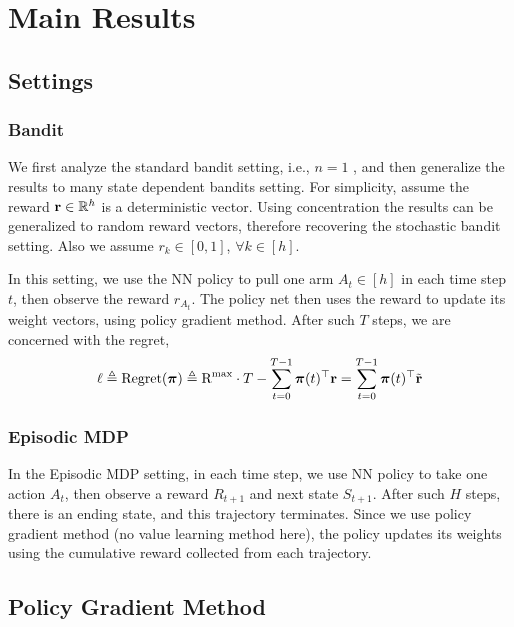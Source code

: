 \section{Main Results}

\subsection{Settings}

\subsubsection{Bandit}

We first analyze the standard bandit setting, i.e., $n = 1$ , and then generalize the results to many state dependent bandits setting. For simplicity, assume the reward ${\mathbf{r}} \in {\mathbb{R}}^h$ is a deterministic vector. Using concentration the results can be generalized to random reward vectors, therefore recovering the stochastic bandit setting. Also we assume $r_k \in [0, 1]$, $\forall k \in [h]$.

In this setting, we use the NN policy to pull one arm $A_t \in [h]$ in each time step $t$, then observe the reward $r_{A_t}$. The policy net then uses the reward to update its weight vectors, using policy gradient method. After such $T$ steps, we are concerned with the regret,
\begin{equation*}
    \ell \triangleq {\text{Regret}}({\boldsymbol{\pi}}) \triangleq {\text{R}}^{\max} \cdot T - \sum\limits_{t=0}^{T-1}{ {\boldsymbol{\pi}}(t)^\top {\mathbf{r}} } = \sum\limits_{t=0}^{T-1}{ {\boldsymbol{\pi}}(t)^\top {\tilde{\mathbf{r}}} }
\end{equation*}

\subsubsection{Episodic MDP}

In the Episodic MDP setting, in each time step, we use NN policy to take one action $A_t$, then observe a reward $R_{t+1}$ and next state $S_{t+1}$. After such $H$ steps, there is an ending state, and this trajectory terminates. Since we use policy gradient method (no value learning method here), the policy updates its weights using the cumulative reward collected from each trajectory. 


\subsection{Policy Gradient Method}

